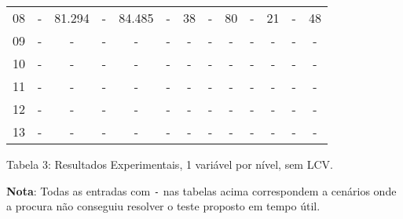 \documentclass[12pt,a4paper]{article}
\begin{document}
\begin{adjustbox}{width={\textwidth}, totalheight={\textheight}, keepaspectratio}
\begin{tabular}{l cccc cccc cccc}
            08    & -                                          & 81.294                          & -                                  & 84.485     & -   & 38   & -     & 80         & -   & 21   & -     & 48         \\
            09    & -                                          & -                               & -                                  & -          & -   & -    & -     & -          & -   & -    & -     & -          \\
            10    & -                                          & -                               & -                                  & -          & -   & -    & -     & -          & -   & -    & -     & -          \\
            11    & -                                          & -                               & -                                  & -          & -   & -    & -     & -          & -   & -    & -     & -          \\
            12    & -                                          & -                               & -                                  & -          & -   & -    & -     & -          & -   & -    & -     & -          \\
            13    & -                                          & -                               & -                                  & -          & -   & -    & -     & -          & -   & -    & -     & -          \\
            \bottomrule
      \end{tabular}
\end{adjustbox}

\vspace*{0.5cm}

\begin{center}
      Tabela 3: Resultados Experimentais, 1 variável por nível, sem LCV.
\end{center}

\vspace*{1cm}

\textbf{Nota}: Todas as entradas com \texttt{-} nas tabelas acima correspondem a
cenários onde a procura não conseguiu resolver o teste proposto em tempo útil.
\end{document}
